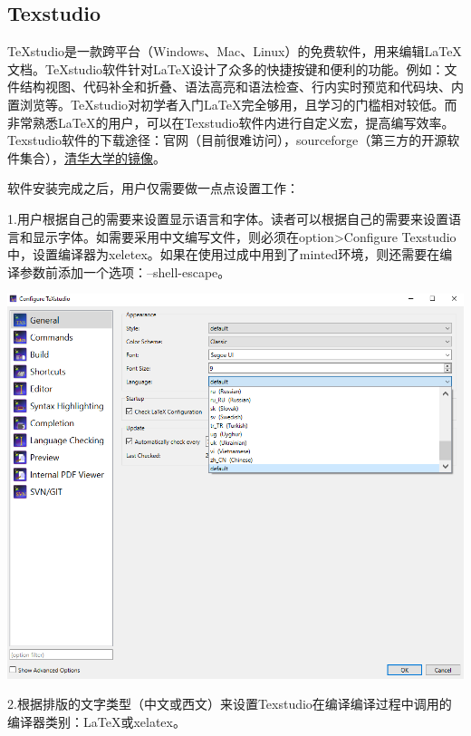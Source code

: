\documentclass[12pt]{book}
\begin{document}
\subsection{Texstudio}
TeXstudio是一款跨平台（Windows、Mac、Linux）的免费软件，用来编辑\LaTeX{}文档。TeXstudio软件针对\LaTeX{}设计了众多的快捷按键和便利的功能。例如：文件结构视图、代码补全和折叠、语法高亮和语法检查、行内实时预览和代码块、内置浏览等。TeXstudio对初学者入门\LaTeX{}完全够用，且学习的门槛相对较低。而非常熟悉\LaTeX{}的用户，可以在Texstudio软件内进行自定义宏，提高编写效率。Texstudio软件的下载途径：官网（目前很难访问），sourceforge（第三方的开源软件集合），\href{https://mirrors.tuna.tsinghua.edu.cn/github-release/texstudio-org/texstudio/}{清华大学的镜像}。

软件安装完成之后，用户仅需要做一点点设置工作：

1.用户根据自己的需要来设置显示语言和字体。读者可以根据自己的需要来设置语言和显示字体。如需要采用中文编写文件，则必须在option>Configure Texstudio 中，设置编译器为xeletex。如果在使用过成中用到了minted环境，则还需要在编译参数前添加一个选项：--shell-escape。

\begin{center}
     \includegraphics[scale=0.8]{./texstudio-lang.png}
\end{center}
2.根据排版的文字类型（中文或西文）来设置Texstudio在编译编译过程中调用的编译器类别：\LaTeX{}或xelatex。
\end{document}
